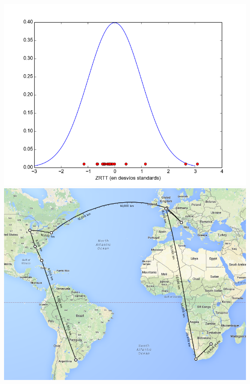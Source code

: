 \includegraphics[width=5in]{imgs/pretoria_dist.png}
\includegraphics[width=5in]{imgs/maps/pretoria.png}
